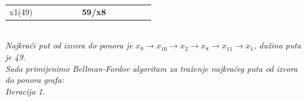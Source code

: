 \documentclass[12pt]{article}
\begin{document}
\begin{enumerate}
\begin{center}
{\begin{tabular}{|c|ccccc|c|ccccc}
x1(49) &  &  &  &  &  & \textbf{59/x8} &  &  &  &  &  \\ \cline{1-1} \cline{7-7}
\end{tabular}%
      }\\
      \vspace{0.5cm}
      \textit{Najkraći put od izvora do ponora je $x_9 \rightarrow x_{10}  \rightarrow x_2 \rightarrow x_8\rightarrow x_{11} \rightarrow x_1$, dužina puta je 49. }\\
      \vspace{0.5cm}
    \textit{Sada primijenimo Bellman-Fordov algoritam za traženje najkraćeg puta od izvora do ponora grafa:\\
    Iteracija 1.}
    
     \\
  

\end{center}
\end{enumerate}
\end{document}

